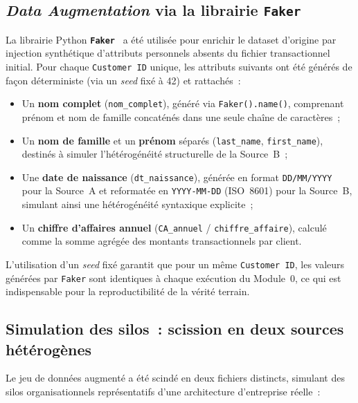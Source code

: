 \subsection{\textit{Data Augmentation} via la librairie \texttt{Faker}}
\label{subsec:faker}

La librairie Python \textbf{\texttt{Faker}}~\cite{faker2024} a été
utilisée pour enrichir le dataset d'origine par injection synthétique
d'attributs personnels absents du fichier transactionnel initial. Pour
chaque \texttt{Customer~ID} unique, les attributs suivants ont été
générés de façon déterministe (via un \textit{seed} fixé à 42) et
rattachés~:

\begin{itemize}
  \item Un \textbf{nom complet} (\texttt{nom\_complet}), généré via
    \texttt{Faker().name()}, comprenant prénom et nom de famille
    concaténés dans une seule chaîne de caractères~;
  \item Un \textbf{nom de famille} et un \textbf{prénom} séparés
    (\texttt{last\_name}, \texttt{first\_name}), destinés à simuler
    l'hétérogénéité structurelle de la Source~B~;
  \item Une \textbf{date de naissance} (\texttt{dt\_naissance}),
    générée en format \texttt{DD/MM/YYYY} pour la Source~A et
    reformatée en \texttt{YYYY-MM-DD} (ISO~8601) pour la Source~B,
    simulant ainsi une hétérogénéité syntaxique explicite~;
  \item Un \textbf{chiffre d'affaires annuel}
    (\texttt{CA\_annuel} / \texttt{chiffre\_affaire}), calculé comme
    la somme agrégée des montants transactionnels par client.
\end{itemize}

\noindent L'utilisation d'un \textit{seed} fixé garantit que pour un
même \texttt{Customer~ID}, les valeurs générées par \texttt{Faker}
sont identiques à chaque exécution du Module~0, ce qui est
indispensable pour la reproductibilité de la vérité terrain.

\subsection{Simulation des silos~: scission en deux sources hétérogènes}
\label{subsec:silos}

Le jeu de données augmenté a été scindé en deux fichiers distincts,
simulant des silos organisationnels représentatifs d'une architecture
d'entreprise réelle~:

